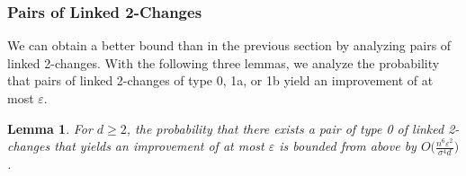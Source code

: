 \documentclass[11pt,DIV=12,a4paper]{scrartcl}
\newtheorem{lemma}[claim]{Lemma}
\newcommand{\eps}{\varepsilon}
\begin{document}
\subsubsection{Pairs of Linked 2-Changes}

We can obtain a better bound than in the previous section by analyzing pairs of linked 2-changes.
With the following three lemmas, we analyze the probability that pairs of linked 2-changes of type 0, 1a, or 1b
yield an improvement of at most $\eps$.

\begin{lemma}
\label{lem:pairs0sed}
For $d \geq 2$, the probability that there exists a pair of type 0 of linked 2-changes that yields an improvement of at most $\eps$ is bounded
from above by $O\bigl(\frac{n^6 \eps^2}{\sigma^{4}d}\bigr)$.
\end{lemma}
\end{document}
